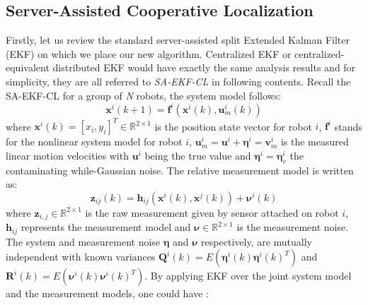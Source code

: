 \documentclass[conference]{IEEEtran}
\begin{document}
\subsection{Server-Assisted Cooperative Localization}
Firstly, let us review the standard server-assisted split Extended Kalman Filter (EKF) \cite{kia2018serverassisted} on which we place our new algorithm.
Centralized EKF or centralized-equivalent distributed EKF \cite{roumeliotis2002distributed,kia2014centralizedequivalent,kia2016cooperative,kia2018serverassisted,luft2018recursive} would have exactly the same analysis results and for simplicity, they are all referred to \emph{SA-EKF-CL} in following contents.
Recall the SA-EKF-CL for a group of \emph{N} robots, the system model follows:
\begin{equation}
	\boldsymbol{x}^i(k+1) = \boldsymbol{f}^i(\boldsymbol{x}^i(k),\boldsymbol{u}^i_m(k))
	\label{equ::CEKF_sys}
\end{equation}
where $\boldsymbol{x}^i(k) = [x_i,y_i]^T\in \mathbb{R}^{2\times1}$ is the position state vector for robot $i$, $\boldsymbol{f}^i$ stands for the nonlinear system model for robot $i$, $\boldsymbol{u}^i_m = \boldsymbol{u}^i + \boldsymbol{\eta}^i =\boldsymbol{v}^i_m$ is the measured linear motion velocities with $\boldsymbol{u}^i$ being the true value and $\boldsymbol{\eta}^i = \boldsymbol{\eta}^i_v$ the contaminating while-Gaussian noise.
The relative measurement model is written as:
\begin{equation}
	\boldsymbol{z}_{ij}(k) = \boldsymbol{h}_{ij}(\boldsymbol{x}^i(k),\boldsymbol{x}^j(k)) + \boldsymbol{\nu}^i(k)
	\label{equ::CEKF_mea_rel}
\end{equation}
where $\boldsymbol{z}_{i,j} \in \mathbb{R}^{2\times1}$ is the raw measurement given by sensor attached on robot $i$, $\boldsymbol{h}_{ij}$ represents the measurement model and $\boldsymbol{\nu} \in \mathbb{R}^{2\times1}$ is the measurement noise.
The system and measurement noise $\boldsymbol{\eta}$ and $\boldsymbol{\nu}$ respectively, are mutually independent with known variances $\boldsymbol{Q}^i(k) =E(\boldsymbol{\eta}^i(k)\boldsymbol{\eta}^i(k)^T)$ and $\boldsymbol{R}^i(k)=E(\boldsymbol{\nu}^i(k)\boldsymbol{\nu}^i(k)^T)$. By applying EKF over the joint system model and the measurement models, one could have \cite{kia2014centralizedequivalent,kia2018serverassisted}:
\end{document}
